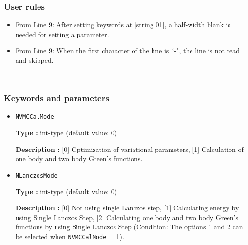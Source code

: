 \subsubsection{User rules}
\begin{itemize}
\item From Line 9: After setting keywords at [string 01], a half-width blank is needed for setting a parameter.
\item From Line 9: When the first character of the line is ``-", the line is not read and skipped.
\end{itemize}

~\subsubsection{Keywords and parameters}
 \begin{itemize}





 
 
 \item  \verb|NVMCCalMode|

 {\bf Type :} int-type (default value: 0)

{\bf Description :} [0] Optimization of variational parameters, [1] Calculation of one body and two body Green's functions.

 \item  \verb|NLanczosMode|

 {\bf Type :} int-type (default value: 0)

{\bf Description :} [0] Not using single Lanczos step, [1] Calculating energy by using Single Lanczos Step, [2] Calculating one body and two body Green's functions by using Single Lanczos Step (Condition: The options 1 and 2 can be selected when \verb|NVMCCalMode| = 1).
 

\end{itemize}
